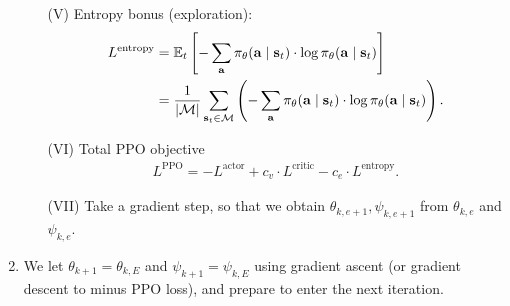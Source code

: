 \documentclass[11pt]{article}  %
\begin{document}
\begin{enumerate}
\begin{enumerate}
    \item[(V)] Entropy bonus (exploration):
    \begin{align*}
      L^{\text{entropy}} &= \ExpSub{t}{-\sum_{\ma}\pi_\theta(\ma\mid\ms_t)\cdot\log\pi_\theta(\ma\mid\ms_t)} \\
      &= \frac{1}{\abs \cM} \sum_{\ms_t \in \cM}\rbrac{-\sum_{\ma}\pi_\theta(\ma\mid\ms_t)\cdot\log\pi_\theta(\ma\mid\ms_t)}.
    \end{align*}

    \item[(VI)] Total PPO objective 
    \begin{align*}
      L^{\text{PPO}} = - L^{\text{actor}} + c_v \cdot L^{\text{critic}} - c_e \cdot L^{\text{entropy}}.
    \end{align*}

    \item[(VII)] Take a gradient step, so that we obtain $\theta_{k, e + 1}, \psi_{k, e+1}$ from $\theta_{k, e}$ and $\psi_{k, e}$. 
  \end{enumerate}

  \item We let $\theta_{k+1} = \theta_{k, E}$ and $\psi_{k+1} = \psi_{k, E}$ using gradient ascent (or gradient descent to minus PPO loss), and prepare to enter the next iteration.
\end{enumerate}
\end{document}

